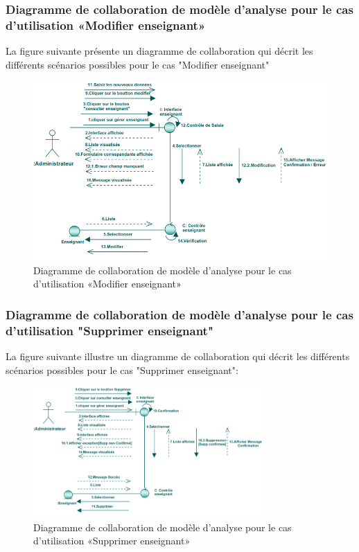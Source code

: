 \documentclass[12 pt ]{report}
\begin{document}
\subsubsection{Diagramme  de  collaboration  de  modèle  d'analyse  pour  le  cas  d'utilisation «Modifier enseignant»  }
La figure suivante présente un diagramme de collaboration qui décrit les différents
scénarios possibles pour le cas "Modifier enseignant"
\begin{figure}[h]
\begin{center}
\includegraphics[width= 14 cm , height =6 cm]{colla_adm_modifierenseignant.png}
 \caption{Diagramme  de  collaboration  de  modèle  d'analyse  pour  le  cas  d'utilisation «Modifier enseignant»}
\end{center}
\end{figure}
\subsubsection{Diagramme  de  collaboration  de  modèle  d'analyse  pour  le  cas  d'utilisation "Supprimer enseignant"  }
La figure suivante illustre un diagramme de collaboration qui décrit les différents
scénarios possibles pour le cas "Supprimer enseignant":
\begin{figure}[h]
\begin{center}
\includegraphics[width= 12 cm , height =5cm]{colla_adm_supprimerenseignant.png}
 \caption{Diagramme  de  collaboration  de  modèle  d'analyse  pour  le  cas  d'utilisation «Supprimer enseignant» }
\end{center}
\end{figure} 
\end{document}
